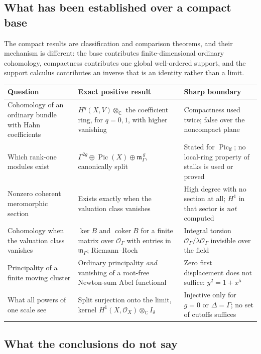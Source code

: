 \documentclass[11pt,letterpaper]{article}
\theoremstyle{definition}
\theoremstyle{remark}
\newcommand{\C}{\mathbb C}
\newcommand{\OO}{\mathcal O}
\newcommand{\mK}{\mathfrak m_\Gamma}
\newcommand{\Pic}{\operatorname{Pic}}
\newcommand{\Piclf}{\operatorname{Pic}_{\mathrm{lf}}}
\newcommand{\coker}{\operatorname{coker}}
\numberwithin{equation}{section}
\begin{document}
\subsection{What has been established over a compact base}

The compact results are classification and comparison theorems, and their mechanism is different: the base contributes finite-dimensional ordinary cohomology, compactness contributes one global well-ordered support, and the support calculus contributes an inverse that is an identity rather than a limit.

\begin{center}\small
\begin{tabular}{@{}L{0.26\textwidth}L{0.32\textwidth}L{0.32\textwidth}@{}}
\toprule
Question & Exact positive result & Sharp boundary\\
\midrule
Cohomology of an ordinary bundle with Hahn coefficients & $H^q(X,V)\otimes_\C$ the coefficient ring, for $q=0,1$, with higher vanishing & Compactness used twice; false over the noncompact plane\\[0.45em]
Which rank-one modules exist & $\Gamma^{2g}\oplus\Pic(X)\oplus\mK^{\,g}$, canonically split & Stated for $\Piclf$; no local-ring property of stalks is used or proved\\[0.45em]
Nonzero coherent meromorphic section & Exists exactly when the valuation class vanishes & High degree with no section at all; $H^1$ in that sector is \emph{not} computed\\[0.45em]
Cohomology when the valuation class vanishes & $\ker B$ and $\coker B$ for a finite matrix over $\OO_\Gamma$ with entries in $\mK$; Riemann--Roch & Integral torsion $\OO_\Gamma/\lambda\OO_\Gamma$ invisible over the field\\[0.45em]
Principality of a finite moving cluster & Ordinary principality \emph{and} vanishing of a root-free Newton-sum Abel functional & Zero first displacement does not suffice: $y^2=1+x^5$\\[0.45em]
What all powers of one scale see & Split surjection onto the limit, kernel $H^1(X,\OO_X)\otimes_\C I_\delta$ & Injective only for $g=0$ or $\Delta=\Gamma$; no set of cutoffs suffices\\
\bottomrule
\end{tabular}
\end{center}

\subsection{What the conclusions do not say}
\end{document}
